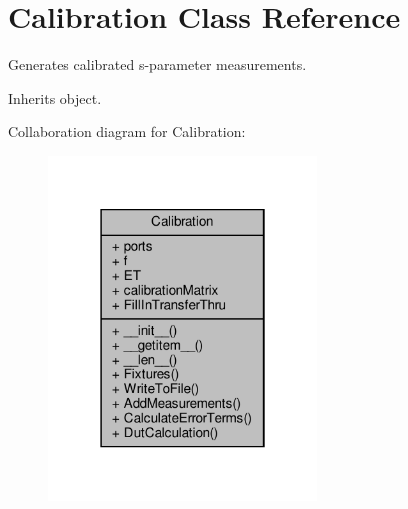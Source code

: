 \hypertarget{classSignalIntegrity_1_1Measurement_1_1Calibration_1_1Calibration_1_1Calibration}{}\section{Calibration Class Reference}
\label{classSignalIntegrity_1_1Measurement_1_1Calibration_1_1Calibration_1_1Calibration}


Generates calibrated s-\/parameter measurements.  




Inherits object.



Collaboration diagram for Calibration\+:
\nopagebreak
\begin{figure}[H]
\begin{center}
\leavevmode
\includegraphics[width=202pt]{classSignalIntegrity_1_1Measurement_1_1Calibration_1_1Calibration_1_1Calibration__coll__graph}
\end{center}
\end{figure}
